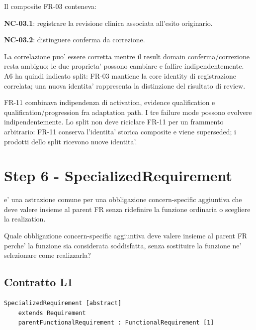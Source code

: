 \documentclass[11pt,a4paper]{article}
\begin{document}
\begin{ddtaexample}[title={DermaTriage A6 - FR-03 split}]
Il composite FR-03 conteneva:\par
\textbf{NC-03.1}: registrare la revisione clinica associata all'esito originario.\par
\textbf{NC-03.2}: distinguere conferma da correzione.\par
La correlazione puo' essere corretta mentre il result domain conferma/correzione resta ambiguo; le due proprieta' possono cambiare e fallire indipendentemente. A6 ha quindi indicato split: FR-03 mantiene la core identity di registrazione correlata; una nuova identita' rappresenta la distinzione del risultato di review.
\end{ddtaexample}

\begin{ddtaexample}[title={DermaTriage A6 - FR-11 e identity preservation}]
FR-11 combinava indipendenza di activation, evidence qualification e qualification/progression fra adaptation path. I tre failure mode possono evolvere indipendentemente. Lo split non deve riciclare FR-11 per un frammento arbitrario: FR-11 conserva l'identita' storica composite e viene superseded; i prodotti dello split ricevono nuove identita'.
\end{ddtaexample}

\section{Step 6 - SpecializedRequirement}
\closedtag

\SR{} e' una astrazione comune per una obbligazione concern-specific aggiuntiva che deve valere insieme al parent FR senza ridefinire la funzione ordinaria o scegliere la realization.

\begin{ddtacheck}[title={Domanda fondamentale}]
Quale obbligazione concern-specific aggiuntiva deve valere insieme al parent FR perche' la funzione sia considerata soddisfatta, senza sostituire la funzione ne' selezionare come realizzarla?
\end{ddtacheck}

\subsection{Contratto L1}

\begin{lstlisting}
SpecializedRequirement [abstract]
    extends Requirement
    parentFunctionalRequirement : FunctionalRequirement [1]
\end{lstlisting}
\end{document}
